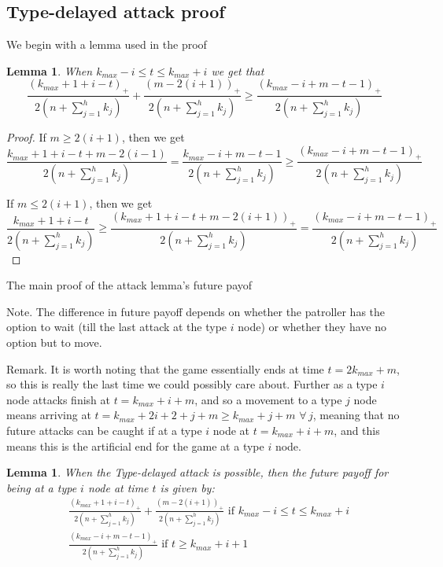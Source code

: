 \documentclass[a4paper,10pt]{article}
\newcommand{\denominator}{\ensuremath{n+\sum\limits_{j=1}^{h} k_{j}}}
\newcommand{\pospart}[1]{\left( #1 \right)_{+}}
\newtheorem{lemma}[theorem]{Lemma}
\theoremstyle{definition}
\theoremstyle{definition}
\theoremstyle{remark}
\theoremstyle{definition}
\begin{document}
\subsection{Type-delayed attack proof}
\label{Type-deayed attack proof}
We begin with a lemma used in the proof
\begin{lemma}
When $k_{max}-i \leq t \leq k_{max}+i$ we get that
$$\frac{\pospart{k_{max}+1+i-t}}{2 \left( \denominator \right)} + \frac{\pospart{m-2(i+1)}}{2 \left( \denominator \right)} \geq \frac{\pospart{k_{max}-i+m-t-1}}{2 \left( \denominator \right)} $$
\end{lemma}

\begin{proof}
If $m \geq 2(i+1)$, then we get
$$\frac{k_{max}+1+i-t+m-2(i-1)}{2 \left( \denominator \right)}=\frac{k_{max}-i+m-t-1}{2 \left( \denominator \right)} \geq \frac{\pospart{k_{max}-i+m-t-1}}{2 \left( \denominator \right)}$$

If $m \leq 2(i+1)$, then we get
$$\frac{k_{max}+1+i-t}{2 \left( \denominator \right)} \geq \frac{\pospart{k_{max}+1+i-t+m-2(i+1)}}{2 \left( \denominator \right)} =\frac{\pospart{k_{max}-i+m-t-1}}{2 \left( \denominator \right)}$$
\end{proof}

The main proof of the attack lemma's future payof

Note. The difference in future payoff depends on whether the patroller has the option to wait (till the last attack at the type $i$ node) or whether they have no option but to move.

Remark. It is worth noting that the game essentially ends at time $t=2k_{max}+m$, so this is really the last time we could possibly care about. Further as a type $i$ node attacks finish at $t=k_{max}+i+m$, and so a movement to a type $j$ node means arriving at $t=k_{max}+2i+2+j+m \geq k_{max}+j+m$ $\forall \, j$, meaning that no future attacks can be caught if at a type $i$ node at $t=k_{max}+i+m$, and this means this is the artificial end for the game at a type $i$ node.

\begin{lemma}
When the Type-delayed attack is possible, then the future payoff for being at a type $i$ node at time $t$ is given by:
\begin{align*}
&\frac{\pospart{k_{max}+1+i-t}}{2 \left( \denominator \right)} + \frac{\pospart{m-2(i+1)}}{2 \left( \denominator \right)} \text{  if } k_{max}-i \leq t \leq k_{max}+i \\
&\frac{\pospart{k_{max}-i+m-t-1}}{2 \left( \denominator \right)} \text{  if } t \geq k_{max}+i+1
\end{align*}
\end{lemma}
\end{document}
